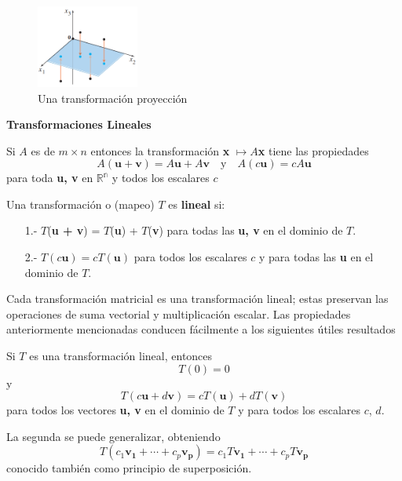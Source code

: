 \documentclass[12 pt]{article}
\begin{document}
\begin{figure}[ht]
  \centerline{\includegraphics[width=0.3\textwidth]{image19.png}}
  \caption{Una transformación proyección}
\end{figure}

\begin{large}
    \textbf{Transformaciones Lineales}
\end{large}

Si $A$ es de $m \times n$ entonces la transformación \textbf{x} $\longmapsto A$\textbf{x} tiene las propiedades $$A(\mathbf{u} + \mathbf{v}) = A\mathbf{u} + A\mathbf{v} \quad \text{y} \quad A(c\mathbf{u}) = cA\mathbf{u}$$ para toda \textbf{u, v} en $\mathbb{R^n}$ y todos los escalares $c$

\begin{tcolorbox}[colback=red!10!white, colframe=red!70!black, title=Propiedades]
    Una transformación o (mapeo) $T$ es \textbf{lineal} si:
    \begin{itemize}
        \item[1.-] $T$(\textbf{u + v}) = $T$(\textbf{u}) + $T$(\textbf{v}) para todas las \textbf{u, v} en el dominio de $T$.
        \item[2.-]$T(c\mathbf{u}) = cT(\mathbf{u})$ para todos los escalares $c$ y para todas las \textbf{u} en el dominio de $T$. 
    \end{itemize}
\end{tcolorbox}

Cada transformación matricial es una transformación lineal; estas preservan las operaciones de suma vectorial y multiplicación escalar. Las propiedades anteriormente mencionadas conducen fácilmente a los siguientes útiles resultados

\begin{tcolorbox}[colback=blue!10!white,colframe=blue!60!black,title=Propiedades]
    Si $T$ es una transformación lineal, entonces $$T(0) = 0$$ y $$T(c \mathbf{u} + d \mathbf{v}) = cT(\mathbf{u}) + dT(\mathbf{v})$$
para todos los vectores \textbf{u, v} en el dominio de $T$ y para todos los escalares $c$, $d$.
\end{tcolorbox}

La segunda se puede generalizar, obteniendo $$T(c_1\mathbf{v_1} + \dotsb + c_p\mathbf{v_p}) = c_1T\mathbf{v_1} + \dotsb + c_pT\mathbf{v_p}$$ conocido también como principio de superposición.
\end{document}
